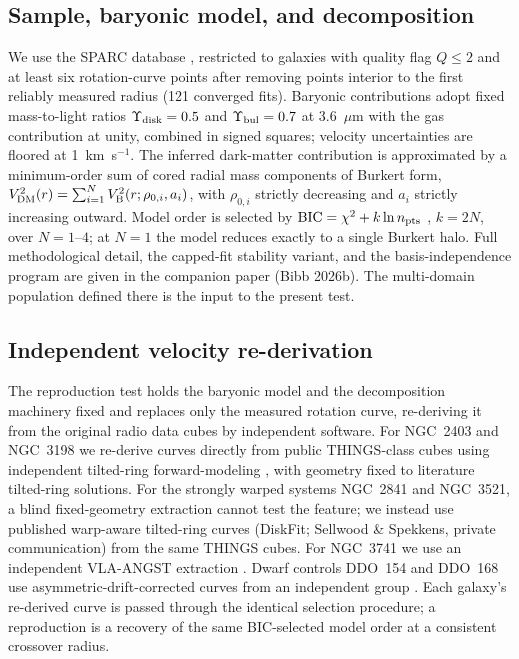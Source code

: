 \documentclass[twocolumn]{aastex701}
\begin{document}
\subsection{Sample, baryonic model, and decomposition}
We use the SPARC database \citep{Lelli2016}, restricted to galaxies with quality
flag $Q \le 2$ and at least six rotation-curve points after removing points
interior to the first reliably measured radius (121 converged fits). Baryonic
contributions adopt fixed mass-to-light ratios $\Upsilon_{\rm disk} = 0.5$ and
$\Upsilon_{\rm bul} = 0.7$ at 3.6~$\mu$m with the gas contribution at unity,
combined in signed squares; velocity uncertainties are floored at 1~km~s$^{-1}$.
The inferred dark-matter contribution is approximated by a minimum-order sum of
cored radial mass components of Burkert form, $V^2_{\rm DM}(r) = \sum_{i=1}^{N}
V^2_{\rm B}(r;\rho_{0,i},a_i)$, with $\rho_{0,i}$ strictly decreasing and $a_i$
strictly increasing outward. Model order is selected by ${\rm BIC} = \chi^2 + k
\ln n_{\rm pts}$ \citep{Schwarz1978,Liddle2007}, $k = 2N$, over $N = 1$--$4$; at
$N = 1$ the model reduces exactly to a single Burkert halo. Full methodological
detail, the capped-fit stability variant, and the basis-independence program are
given in the companion paper (Bibb 2026b). The multi-domain population defined
there is the input to the present test.

\subsection{Independent velocity re-derivation}
The reproduction test holds the baryonic model and the decomposition machinery
fixed and replaces only the measured rotation curve, re-deriving it from the
original radio data cubes by independent software. For NGC~2403 and NGC~3198 we
re-derive curves directly from public THINGS-class cubes using independent
tilted-ring forward-modeling \citep[$^{3\rm D}$Barolo;][]{DiTeodoro2015}, with
geometry fixed to literature tilted-ring solutions. For the strongly warped
systems NGC~2841 and NGC~3521, a blind fixed-geometry extraction cannot test the
feature; we instead use published warp-aware tilted-ring curves (DiskFit;
Sellwood \& Spekkens, private communication) from the same THINGS cubes. For
NGC~3741 we use an independent VLA-ANGST extraction \citep[a different telescope
from the WSRT-based SPARC curve;][]{Walter2008}. Dwarf controls DDO~154 and
DDO~168 use asymmetric-drift-corrected curves from an independent group
\citep[3D forward-modeling;][]{Iorio2017}. Each galaxy's re-derived curve is
passed through the identical selection procedure; a reproduction is a recovery of
the same BIC-selected model order at a consistent crossover radius.
\end{document}
